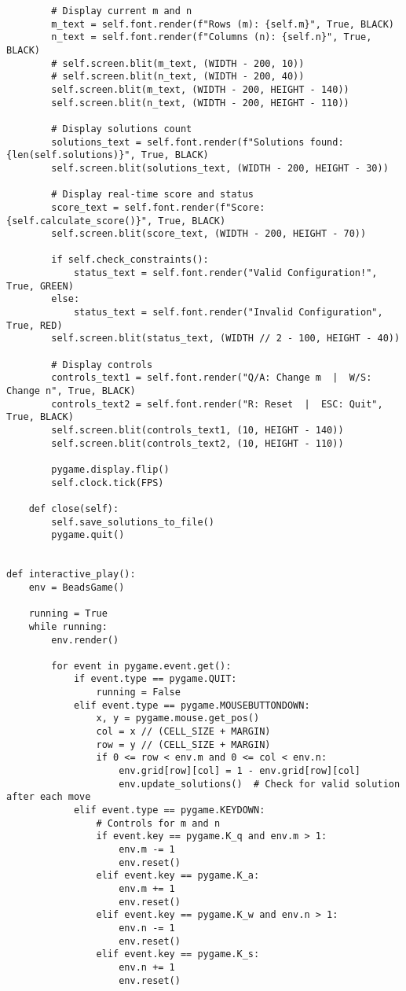 \begin{lstlisting}
        # Display current m and n
        m_text = self.font.render(f"Rows (m): {self.m}", True, BLACK)
        n_text = self.font.render(f"Columns (n): {self.n}", True, BLACK)
        # self.screen.blit(m_text, (WIDTH - 200, 10))
        # self.screen.blit(n_text, (WIDTH - 200, 40))
        self.screen.blit(m_text, (WIDTH - 200, HEIGHT - 140))
        self.screen.blit(n_text, (WIDTH - 200, HEIGHT - 110))

        # Display solutions count
        solutions_text = self.font.render(f"Solutions found: {len(self.solutions)}", True, BLACK)
        self.screen.blit(solutions_text, (WIDTH - 200, HEIGHT - 30))

        # Display real-time score and status
        score_text = self.font.render(f"Score: {self.calculate_score()}", True, BLACK)
        self.screen.blit(score_text, (WIDTH - 200, HEIGHT - 70))

        if self.check_constraints():
            status_text = self.font.render("Valid Configuration!", True, GREEN)
        else:
            status_text = self.font.render("Invalid Configuration", True, RED)
        self.screen.blit(status_text, (WIDTH // 2 - 100, HEIGHT - 40))

        # Display controls
        controls_text1 = self.font.render("Q/A: Change m  |  W/S: Change n", True, BLACK)
        controls_text2 = self.font.render("R: Reset  |  ESC: Quit", True, BLACK)
        self.screen.blit(controls_text1, (10, HEIGHT - 140))
        self.screen.blit(controls_text2, (10, HEIGHT - 110))

        pygame.display.flip()
        self.clock.tick(FPS)

    def close(self):
        self.save_solutions_to_file()
        pygame.quit()


def interactive_play():
    env = BeadsGame()

    running = True
    while running:
        env.render()

        for event in pygame.event.get():
            if event.type == pygame.QUIT:
                running = False
            elif event.type == pygame.MOUSEBUTTONDOWN:
                x, y = pygame.mouse.get_pos()
                col = x // (CELL_SIZE + MARGIN)
                row = y // (CELL_SIZE + MARGIN)
                if 0 <= row < env.m and 0 <= col < env.n:
                    env.grid[row][col] = 1 - env.grid[row][col]
                    env.update_solutions()  # Check for valid solution after each move
            elif event.type == pygame.KEYDOWN:
                # Controls for m and n
                if event.key == pygame.K_q and env.m > 1:
                    env.m -= 1
                    env.reset()
                elif event.key == pygame.K_a:
                    env.m += 1
                    env.reset()
                elif event.key == pygame.K_w and env.n > 1:
                    env.n -= 1
                    env.reset()
                elif event.key == pygame.K_s:
                    env.n += 1
                    env.reset()


\end{lstlisting}
